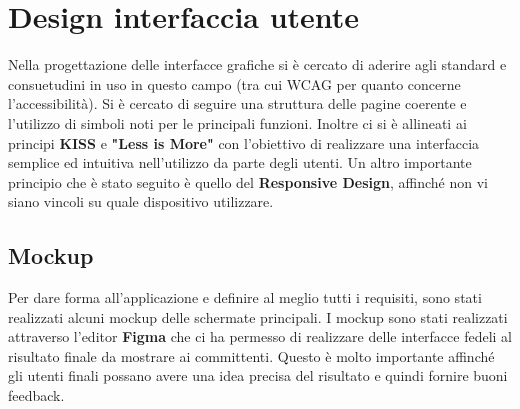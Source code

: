 \documentclass[italian]{report}
\begin{document}
\section{Design interfaccia utente}
Nella progettazione delle interfacce grafiche si è cercato di aderire agli standard e consuetudini in uso in questo campo (tra cui WCAG per quanto concerne l'accessibilità). Si è cercato di seguire una struttura delle pagine coerente e l'utilizzo di simboli noti per le principali funzioni. Inoltre 
ci si è allineati ai principi \textbf{KISS} e \textbf{"Less is More"} con l’obiettivo di realizzare una interfaccia semplice ed intuitiva nell’utilizzo da parte degli utenti. Un altro importante principio che è stato seguito è quello del \textbf{Responsive Design}, affinché non vi siano vincoli su quale dispositivo utilizzare.
\subsection{Mockup}
Per dare forma all'applicazione e definire al meglio tutti i requisiti, sono stati realizzati alcuni mockup delle schermate principali.
I mockup sono stati realizzati attraverso l'editor \textbf{Figma} che ci ha permesso di realizzare delle interfacce fedeli al risultato finale da mostrare ai committenti. Questo è molto importante affinché gli utenti finali possano avere una idea precisa del risultato e quindi fornire buoni feedback.
\end{document}
